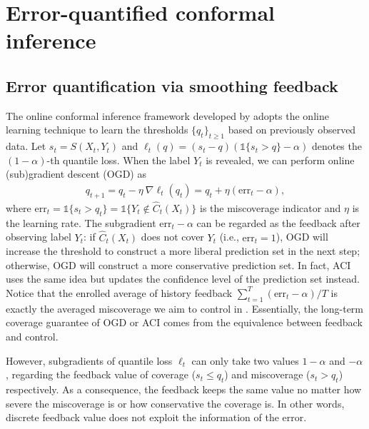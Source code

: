 \section{Error-quantified conformal inference}

\subsection{Error quantification via smoothing feedback}
\vspace{-0.25em}
\label{ECI}

The online conformal inference framework developed by \citet{aci_gibbs2021adaptive} adopts the online learning technique to learn the thresholds $\{q_t\}_{t\geq 1}$ based on previously observed data.
Let $s_t = S(X_t, Y_t)$ and $\ell_t(q) = (s_t-q)(\mathds{1}\{s_t > q\}-\alpha)$ denotes the $(1-\alpha)$-th quantile loss.
When the label $Y_t$ is revealed, we can perform online (sub)gradient descent (OGD) as
\begin{equation}
\begin{aligned}
q_{t+1} =q_t-\eta\ \nabla \ell_t(q_t)= q_t+\eta(\mathrm{err}_t-\alpha), 
\label{quantile tracking}
\end{aligned}
\end{equation}
where $\text{err}_t=\mathds{1}\{s_t>q_t\} = \mathds{1}\{Y_t\not\in \hat{C}_t(X_t)\}$ is the miscoverage indicator and $\eta$ is the learning rate. The subgradient $\mathrm{err}_t-\alpha$ can be regarded as the feedback after observing label $Y_t$: if $\hat{C}_t(X_t)$ does not cover $Y_t$ (i.e., $\mathrm{err}_t=1$), OGD will increase the threshold to construct a more liberal prediction set in the next step; otherwise, OGD will construct a more conservative prediction set. In fact, ACI uses the same idea but updates the confidence level of the prediction set instead. Notice that the enrolled average of history feedback $\sum_{t=1}^T(\mathrm{err}_t-\alpha)/T$ is exactly the averaged miscoverage  we aim to control in . Essentially, the long-term coverage guarantee of OGD or ACI comes from the equivalence between feedback and control.

However, subgradients of quantile loss $\ell_t$ can only take two values $1-\alpha$ and $-\alpha$, regarding the feedback value of coverage ($s_t \leq q_t$) and miscoverage ($s_t > q_t$) respectively. As a consequence, the feedback keeps the same value no matter how severe the miscoverage is or how conservative the coverage is. In other words, discrete feedback value does not exploit the information of the error. 

